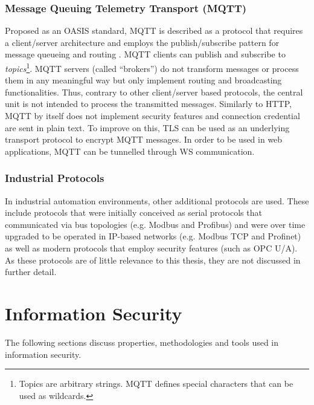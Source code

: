 \subsubsection{Message Queuing Telemetry Transport (\ac{MQTT})}
Proposed as an \ac{OASIS} standard, \ac{MQTT} is described as a protocol that requires a client/server architecture and employs the publish/subscribe pattern for message queueing and routing \cite{gupta_banks_2019}. \ac{MQTT} clients can publish and subscribe to \emph{topics}\footnote{Topics are arbitrary strings. \ac{MQTT} defines special characters that can be used as wildcards.}. \ac{MQTT} servers (called \enquote{brokers}) do not transform messages or process them in any meaningful way but only implement routing and broadcasting functionalities. Thus, contrary to other client/server based protocols, the central unit is not intended to process the transmitted messages. Similarly to \ac{HTTP}, \ac{MQTT} by itself does not implement security features and connection credential are sent in plain text. To improve on this, \ac{TLS} can be used as an underlying transport protocol to encrypt \ac{MQTT} messages. In order to be used in web applications, \ac{MQTT} can be tunnelled through \ac{WS} communication.

\subsubsection{Industrial Protocols}
In industrial automation environments, other additional protocols are used. These include protocols that were initially conceived as serial protocols that communicated via bus topologies (e.g. Modbus and Profibus) and were over time upgraded to be operated in \ac{IP}-based networks (e.g. Modbus \ac{TCP} and Profinet) as well as modern protocols that employ security features (such as \ac{OPC U/A}). As these protocols are of little relevance to this thesis, they are not discussed in further detail.

\section{Information Security}
\label{sec:information-security}
The following sections discuss properties, methodologies and tools used in information security.

